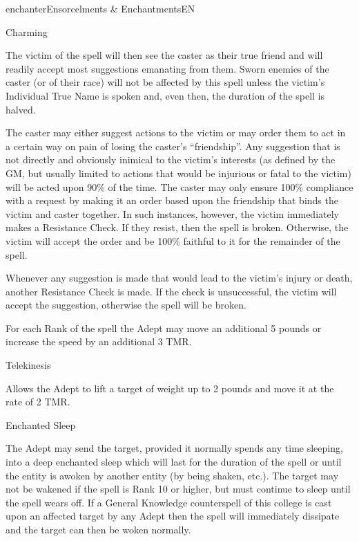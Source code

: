 \begin{College}[1.1]{enchanter}{Ensorcelments \& Enchantments}{EN}
\begin{spell}[G-1]{Charming}
\begin{effects}
The victim of the spell will then see the caster as their true friend
and will readily accept most suggestions emanating from them.  Sworn
enemies of the caster (or of their race) will not be affected by this
spell unless the victim’s Individual True Name is spoken and, even
then, the duration of the spell is halved.

The caster may either suggest actions to the victim or may order them
to act in a certain way on pain of losing the caster’s “friendship”.
Any suggestion that is not directly and obviously inimical to the
victim’s interests (as defined by the GM, but usually limited to
actions that would be injurious or fatal to the victim) will be acted
upon 90\% of the time.  The caster may only ensure 100\% compliance
with a request by making it an order based upon the friendship that
binds the victim and caster together.  In such instances, however, the
victim immediately makes a Resistance Check.  If they resist, then the
spell is broken.  Otherwise, the victim will accept the order and be
100\% faithful to it for the remainder of the spell.

Whenever any suggestion is made that would lead to the victim’s injury
or death, another Resistance Check is made.  If the check is
unsuccessful, the victim will accept the suggestion, otherwise the
spell will be broken.

For each Rank of the spell the Adept may move an additional 5 pounds
or increase the speed by an additional 3 TMR.
\end{effects}
\end{spell}

\begin{spell}[G-2]{Telekinesis}
\begin{effects}
Allows the Adept to lift a target of weight up to 2 pounds and move it
at the rate of 2 TMR.
\end{effects}
\end{spell}

\begin{spell}[G-3]{Enchanted Sleep}

\begin{effects}
The Adept may send the target, provided it normally spends any time
sleeping, into a deep enchanted sleep which will last for the duration
of the spell or until the entity is awoken by another entity (by being
shaken, etc.).  The target may not be wakened if the spell is Rank 10
or higher, but must continue to sleep until the spell wears off. If a
General Knowledge counterspell of this college is cast upon an
affected target by any Adept then the spell will immediately dissipate
and the target can then be woken normally.
\end{effects}
\end{spell}


\end{College}
